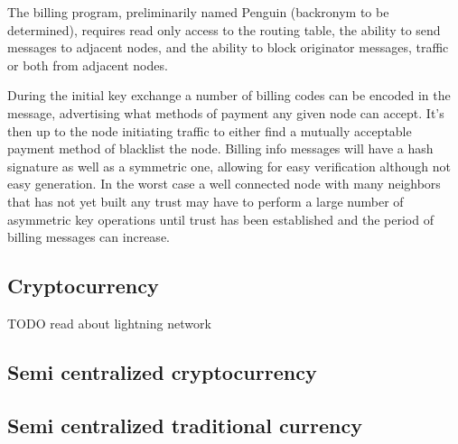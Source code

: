 \documentclass[11pt]{article}
\begin{document}
    The billing program, preliminarily named Penguin (backronym to be determined), requires read only access to the routing table, the ability to send messages to adjacent nodes, and the ability to block originator messages, traffic or both from adjacent nodes.
    
    During the initial key exchange a number of billing codes can be encoded in the message, advertising what methods of payment any given node can accept. It's then up to the node initiating traffic to either find a mutually acceptable payment method of blacklist the node. Billing info messages will have a hash signature as well as a symmetric one, allowing for easy verification although not easy generation. In the worst case a well connected node with many neighbors that has not yet built any trust may have to perform a large number of asymmetric key operations until trust has been established and the period of billing messages can increase.

    \subsection{Cryptocurrency}
    
          TODO read about lightning network
    
    \subsection{Semi centralized cryptocurrency}
    \subsection{Semi centralized traditional currency}

\medskip
\end{document}
